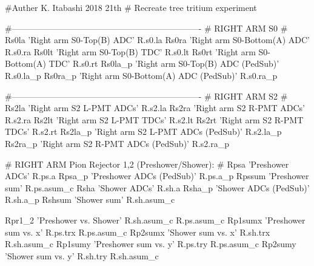 #Auther K. Itabashi 2018 21th
# Recreate tree tritium experiment


#-------------------------------------------------------------------
# RIGHT ARM S0
#
Rs0la 'Right arm S0-Top(B) ADC' R.s0.la
Rs0ra 'Right arm S0-Bottom(A) ADC' R.s0.ra
Rs0lt 'Right arm S0-Top(B) TDC' R.s0.lt
Rs0rt 'Right arm S0-Bottom(A) TDC' R.s0.rt
Rs0la_p 'Right arm S0-Top(B) ADC (PedSub)' R.s0.la_p
Rs0ra_p 'Right arm S0-Bottom(A) ADC (PedSub)' R.s0.ra_p

#-------------------------------------------------------------------
# RIGHT ARM S2
#
Rs2la 'Right arm S2 L-PMT ADCs' R.s2.la
Rs2ra 'Right arm S2 R-PMT ADCs' R.s2.ra
Rs2lt 'Right arm S2 L-PMT TDCs' R.s2.lt
Rs2rt 'Right arm S2 R-PMT TDCs' R.s2.rt
Rs2la_p 'Right arm S2 L-PMT ADCs (PedSub)' R.s2.la_p 
Rs2ra_p 'Right arm S2 R-PMT ADCs (PedSub)' R.s2.ra_p 

# RIGHT ARM Pion Rejector 1,2 (Preshower/Shower):
#
Rpsa   'Preshower ADCs' R.ps.a
Rpsa_p 'Preshower ADCs (PedSub)' R.ps.a_p
Rpssum 'Preshower sum' R.ps.asum_c
Rsha   'Shower ADCs' R.sh.a
Rsha_p 'Shower ADCs (PedSub)' R.sh.a_p
Rshsum  'Shower sum' R.sh.asum_c

Rpr1_2 'Preshower vs. Shower' R.sh.asum_c R.ps.asum_c
Rp1sumx 'Preshower sum vs. x' R.ps.trx R.ps.asum_c
Rp2sumx 'Shower sum vs. x' R.sh.trx R.sh.asum_c
Rp1sumy 'Preshower sum vs. y' R.ps.try R.ps.asum_c
Rp2sumy 'Shower sum vs. y' R.sh.try R.sh.asum_c

